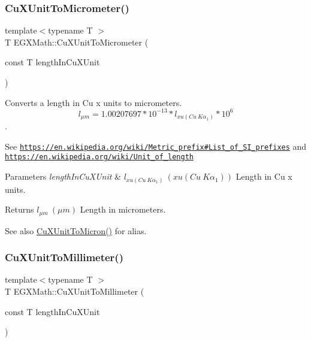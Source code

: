 \subsubsection{\texorpdfstring{Cu\+X\+Unit\+To\+Micrometer()}{CuXUnitToMicrometer()}}
{\footnotesize\ttfamily template$<$typename T $>$ \\
T E\+G\+X\+Math\+::\+Cu\+X\+Unit\+To\+Micrometer (\begin{DoxyParamCaption}\item[{const T}]{length\+In\+Cu\+X\+Unit }\end{DoxyParamCaption})}



Converts a length in Cu x units to micrometers. \[ l_{\mu m}=1.00207697*10^{-13} * l_{xu(Cu\ K\alpha_1)} * 10^{6} \]. 

See \href{https://en.wikipedia.org/wiki/Metric_prefix#List_of_SI_prefixes}{\tt https\+://en.\+wikipedia.\+org/wiki/\+Metric\+\_\+prefix\#\+List\+\_\+of\+\_\+\+S\+I\+\_\+prefixes} and \href{https://en.wikipedia.org/wiki/Unit_of_length}{\tt https\+://en.\+wikipedia.\+org/wiki/\+Unit\+\_\+of\+\_\+length} 
\begin{DoxyParams}{Parameters}
{\em length\+In\+Cu\+X\+Unit} & $ l_{xu(Cu\ K\alpha_1)}\ (xu(Cu\ K\alpha_1))$ Length in Cu x units. \\
\hline
\end{DoxyParams}
\begin{DoxyReturn}{Returns}
$ l_{\mu m}\ (\mu m)$ Length in micrometers. 
\end{DoxyReturn}
\begin{DoxySeeAlso}{See also}
\mbox{\hyperlink{group___e_g_x_math-_conversions-_length_conversions-_non-_s_i-_cu_x_unit-_non-_s_i_ga382a9cae8bb23cf8d54777f5ccbff90b}{Cu\+X\+Unit\+To\+Micron()}} for alias. 
\end{DoxySeeAlso}
\mbox{\label{group___e_g_x_math-_conversions-_length_conversions-_non-_s_i-_cu_x_unit-_s_i_gabc336b44c0573fa86306811f1c5a15b9}} 
\subsubsection{\texorpdfstring{Cu\+X\+Unit\+To\+Millimeter()}{CuXUnitToMillimeter()}}
{\footnotesize\ttfamily template$<$typename T $>$ \\
T E\+G\+X\+Math\+::\+Cu\+X\+Unit\+To\+Millimeter (\begin{DoxyParamCaption}\item[{const T}]{length\+In\+Cu\+X\+Unit }\end{DoxyParamCaption})}



